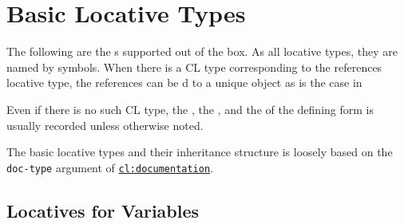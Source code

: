 \section{Basic Locative Types}\label{basic-locative-types}

\label{x-28DREF-3A-40BASIC-LOCATIVE-TYPES-20MGL-PAX-3ASECTION-29}

The following are the
s supported out of the box. As all locative types, they
are named by symbols. When there is a CL type corresponding to the
reference\textquotesingle s locative type, the references can be
d to a
unique object as is the case in

\begin{Shaded}
\begin{Highlighting}[]
 \NormalTok{))}
\OperatorTok{=\textgreater{}}
\end{Highlighting}
\end{Shaded}

Even if there is no such CL type, the
, the
, and
the
of the defining form is usually recorded unless otherwise noted.

The basic locative types and their inheritance structure is loosely
based on the \texttt{doc-type} argument of
\href{http://www.lispworks.com/documentation/HyperSpec/Body/f_docume.htm}{\texttt{cl:documentation}}.

\subsection{Locatives for Variables}\label{locatives-for-variables}

\label{x-28DREF-3A-40VARIABLELIKE-LOCATIVES-20MGL-PAX-3ASECTION-29}

